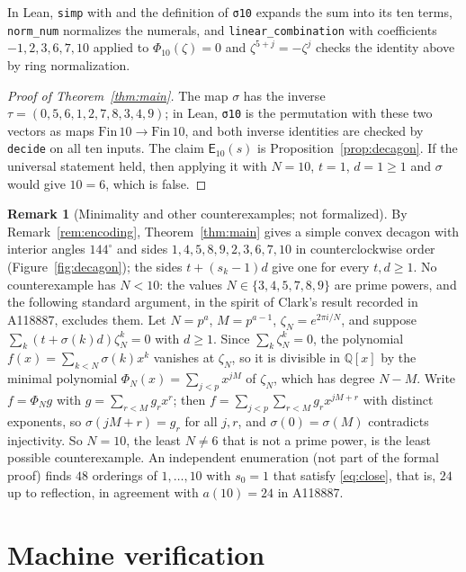\documentclass[11pt]{amsart}
\theoremstyle{plain}
\theoremstyle{definition}
\newtheorem{remark}[theorem]{Remark}
\newcommand{\Q}{\mathbb{Q}}
\newcommand{\Eq}{\mathsf{E}}
\begin{document}
In Lean, \texttt{simp} with  and the definition of \texttt{σ10} expands the sum into its ten terms, \texttt{norm\_num} normalizes the numerals, and \texttt{linear\_combination} with coefficients $-1,2,3,6,7,10$ applied to $\Phi_{10}(\zeta)=0$ and $\zeta^{5+j}=-\zeta^j$ checks the identity above by ring normalization.

\begin{proof}[Proof of Theorem~\ref{thm:main}]
The map $\sigma$ has the inverse $\tau=(0,5,6,1,2,7,8,3,4,9)$; in Lean, \texttt{σ10} is the permutation with these two vectors as maps $\mathrm{Fin}\,10\to\mathrm{Fin}\,10$, and both inverse identities are checked by \texttt{decide} on all ten inputs.
The claim $\Eq_{10}(s)$ is Proposition~\ref{prop:decagon}.
If the universal statement held, then applying it with $N=10$, $t=1$, $d=1\ge1$ and $\sigma$ would give $10=6$, which is false.
\end{proof}

\begin{remark}[Minimality and other counterexamples; not formalized]\label{rem:minimal}
By Remark~\ref{rem:encoding}, Theorem~\ref{thm:main} gives a simple convex decagon with interior angles $144^\circ$ and sides $1,4,5,8,9,2,3,6,7,10$ in counterclockwise order (Figure~\ref{fig:decagon}); the sides $t+(s_k-1)d$ give one for every $t,d\ge1$.
No counterexample has $N<10$: the values $N\in\{3,4,5,7,8,9\}$ are prime powers, and the following standard argument, in the spirit of Clark's result recorded in A118887, excludes them.
Let $N=p^a$, $M=p^{a-1}$, $\zeta_N=e^{2\pi i/N}$, and suppose $\sum_k(t+\sigma(k)d)\zeta_N^k=0$ with $d\ge1$.
Since $\sum_k\zeta_N^k=0$, the polynomial $f(x)=\sum_{k<N}\sigma(k)x^k$ vanishes at $\zeta_N$, so it is divisible in $\Q[x]$ by the minimal polynomial $\Phi_N(x)=\sum_{j<p}x^{jM}$ of $\zeta_N$, which has degree $N-M$.
Write $f=\Phi_N g$ with $g=\sum_{r<M}g_rx^r$; then $f=\sum_{j<p}\sum_{r<M}g_rx^{jM+r}$ with distinct exponents, so $\sigma(jM+r)=g_r$ for all $j,r$, and $\sigma(0)=\sigma(M)$ contradicts injectivity.
So $N=10$, the least $N\ne6$ that is not a prime power, is the least possible counterexample.
An independent enumeration (not part of the formal proof) finds $48$ orderings of $1,\dots,10$ with $s_0=1$ that satisfy \eqref{eq:close}, that is, $24$ up to reflection, in agreement with $a(10)=24$ in A118887.
\end{remark}

\section{Machine verification}\label{sec:lean}
\end{document}
